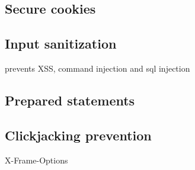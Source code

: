 \clearpage
\subsection{Secure cookies}
\securityMeasure{%
}{
}{
}

\clearpage
\subsection{Input sanitization}
prevents XSS, command injection and sql injection
\securityMeasure{%
}{
}{
}

\clearpage
\subsection{Prepared statements}
\securityMeasure{%
}{
}{
}

\clearpage
\subsection{Clickjacking prevention}
X-Frame-Options
\securityMeasure{%
}{
}{
}
